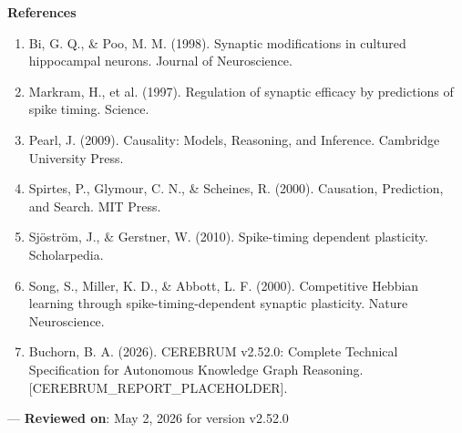 \textbf{References}
\begin{enumerate}
\item Bi, G. Q., \& Poo, M. M. (1998). Synaptic modif\-ications in cultured hippocampal neurons. Journal of Neuros\-cience.
\item Markram, H., et al. (1997). Regulation of synaptic efficacy by predictions of spike timing. Science.
\item Pearl, J. (2009). Causality: Models, Reasoning, and Inference. Cambridge University Press.
\item Spirtes, P., Glymour, C. N., \& Scheines, R. (2000). Causation, Prediction, and Search. MIT Press.
\item Sjöström, J., \& Gerstner, W. (2010). Spike-timing dependent plasticity. Schola\-rpedia.
\item Song, S., Miller, K. D., \& Abbott, L. F. (2000). Competitive Hebbian learning through spike-timing-dependent synaptic plasticity. Nature Neuros\-cience.
\item Buchorn, B. A. (2026). CEREBRUM v2.52.0: Complete Technical Specif\-ication for Autonomous Knowledge Graph Reasoning. [CEREBRUM\_REPORT\_PLACEHOLDER].

\end{enumerate}
---
\textbf{Reviewed on}: May 2, 2026 for version v2.52.0
